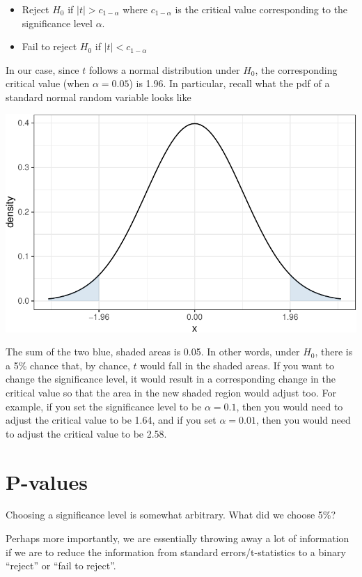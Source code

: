 \documentclass[
  letterpaper,
  DIV=11,
  numbers=noendperiod]{scrreprt}
\begin{document}
\begin{itemize}
\item
  Reject \(H_0\) if \(|t| > c_{1-\alpha}\) where \(c_{1-\alpha}\) is the
  critical value corresponding to the significance level \(\alpha\).
\item
  Fail to reject \(H_0\) if \(|t| < c_{1-\alpha}\)
\end{itemize}

In our case, since \(t\) follows a normal distribution under \(H_0\),
the corresponding critical value (when \(\alpha=0.05\)) is 1.96. In
particular, recall what the pdf of a standard normal random variable
looks like

\includegraphics{03-estimators_files/figure-pdf/unnamed-chunk-3-1.pdf}

The sum of the two blue, shaded areas is 0.05. In other words, under
\(H_0\), there is a 5\% chance that, by chance, \(t\) would fall in the
shaded areas. If you want to change the significance level, it would
result in a corresponding change in the critical value so that the area
in the new shaded region would adjust too. For example, if you set the
significance level to be \(\alpha=0.1\), then you would need to adjust
the critical value to be 1.64, and if you set \(\alpha=0.01\), then you
would need to adjust the critical value to be 2.58.

\section{P-values}\label{p-values}

Choosing a significance level is somewhat arbitrary. What did we choose
5\%?

Perhaps more importantly, we are essentially throwing away a lot of
information if we are to reduce the information from standard
errors/t-statistics to a binary ``reject'' or ``fail to reject''.
\end{document}
